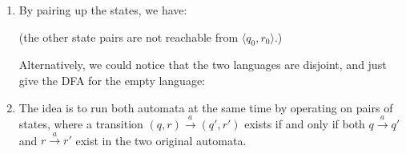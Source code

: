 \documentclass{article}
\theoremstyle{definition}
\theoremstyle{definition}
\theoremstyle{remark}
\begin{document}
\begin{enumerate}
    \item[$(i)$] By pairing up the states, we have:
    \begin{center}
    \end{center}
    (the other state pairs are not reachable from $\langle q_0,r_0\rangle$.)

    Alternatively, we could notice that the two languages are disjoint, and just give the DFA for the empty language:
    \begin{center}
    \end{center}
    
    \item[$(ii)$] The idea is to run both automata at the same time by operating on pairs of states, where a transition $(q,r)\xrightarrow{a}(q',r')$ exists if and only if both $q\xrightarrow{a}q'$ and $r\xrightarrow{a}r'$ exist in the two original automata.
    

\end{enumerate}
\end{document}
